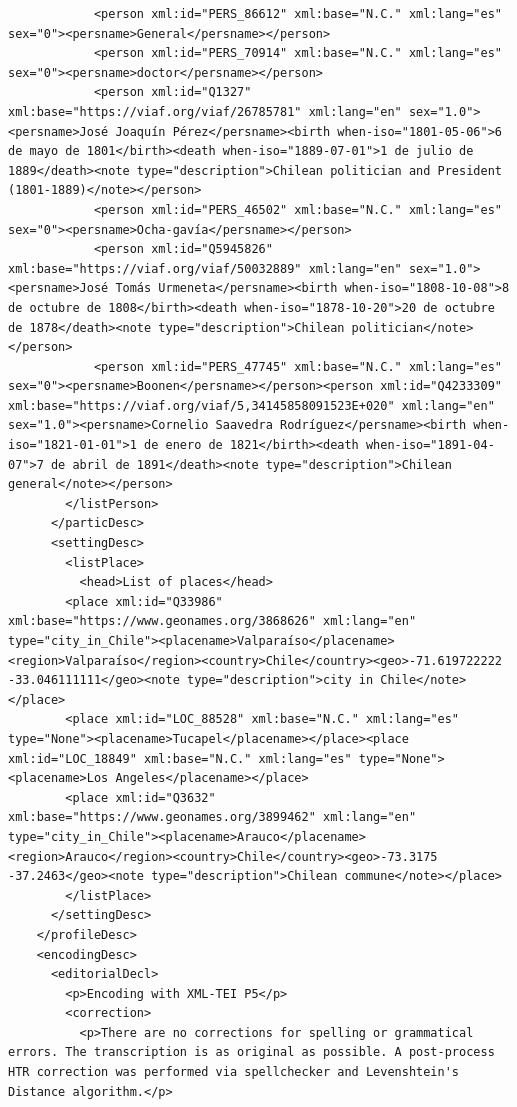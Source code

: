 \begin{verbatim}
            <person xml:id="PERS_86612" xml:base="N.C." xml:lang="es" sex="0"><persname>General</persname></person>
            <person xml:id="PERS_70914" xml:base="N.C." xml:lang="es" sex="0"><persname>doctor</persname></person>
            <person xml:id="Q1327" xml:base="https://viaf.org/viaf/26785781" xml:lang="en" sex="1.0"><persname>José Joaquín Pérez</persname><birth when-iso="1801-05-06">6 de mayo de 1801</birth><death when-iso="1889-07-01">1 de julio de 1889</death><note type="description">Chilean politician and President (1801-1889)</note></person>
            <person xml:id="PERS_46502" xml:base="N.C." xml:lang="es" sex="0"><persname>Ocha-gavía</persname></person>
            <person xml:id="Q5945826" xml:base="https://viaf.org/viaf/50032889" xml:lang="en" sex="1.0"><persname>José Tomás Urmeneta</persname><birth when-iso="1808-10-08">8 de octubre de 1808</birth><death when-iso="1878-10-20">20 de octubre de 1878</death><note type="description">Chilean politician</note></person>
            <person xml:id="PERS_47745" xml:base="N.C." xml:lang="es" sex="0"><persname>Boonen</persname></person><person xml:id="Q4233309" xml:base="https://viaf.org/viaf/5,34145858091523E+020" xml:lang="en" sex="1.0"><persname>Cornelio Saavedra Rodríguez</persname><birth when-iso="1821-01-01">1 de enero de 1821</birth><death when-iso="1891-04-07">7 de abril de 1891</death><note type="description">Chilean general</note></person>
        </listPerson>
      </particDesc>
      <settingDesc>
        <listPlace>
          <head>List of places</head>
        <place xml:id="Q33986" xml:base="https://www.geonames.org/3868626" xml:lang="en" type="city_in_Chile"><placename>Valparaíso</placename><region>Valparaíso</region><country>Chile</country><geo>-71.619722222 -33.046111111</geo><note type="description">city in Chile</note></place>
        <place xml:id="LOC_88528" xml:base="N.C." xml:lang="es" type="None"><placename>Tucapel</placename></place><place xml:id="LOC_18849" xml:base="N.C." xml:lang="es" type="None"><placename>Los Angeles</placename></place>
        <place xml:id="Q3632" xml:base="https://www.geonames.org/3899462" xml:lang="en" type="city_in_Chile"><placename>Arauco</placename><region>Arauco</region><country>Chile</country><geo>-73.3175 -37.2463</geo><note type="description">Chilean commune</note></place>
        </listPlace>
      </settingDesc>
    </profileDesc>
    <encodingDesc>
      <editorialDecl>
        <p>Encoding with XML-TEI P5</p>
        <correction>
          <p>There are no corrections for spelling or grammatical errors. The transcription is as original as possible. A post-process HTR correction was performed via spellchecker and Levenshtein's Distance algorithm.</p>

\end{verbatim}
